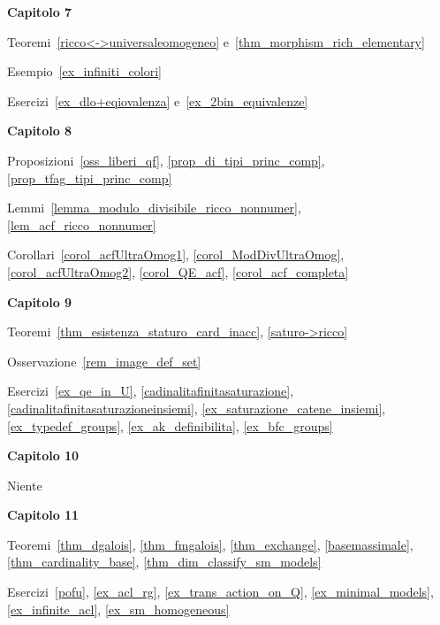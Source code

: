 \textbf{Capitolo 7}

Teoremi~\ref{ricco<->universaleomogeneo} e~\ref{thm_morphism_rich_elementary}

Esempio~\ref{ex_infiniti_colori} 

Esercizi~\ref{ex_dlo+eqiovalenza} e~\ref{ex_2bin_equivalenze}

\textbf{Capitolo 8}

Proposizioni~\ref{oss_liberi_qf}, \ref{prop_di_tipi_princ_comp}, \ref{prop_tfag_tipi_princ_comp}

Lemmi~\ref{lemma_modulo_divisibile_ricco_nonnumer}, \ref{lem_acf_ricco_nonnumer}

Corollari~\ref{corol_acfUltraOmog1}, \ref{corol_ModDivUltraOmog}, \ref{corol_acfUltraOmog2}, \ref{corol_QE_acf}, \ref{corol_acf_completa}

\textbf{Capitolo 9}

Teoremi~\ref{thm_esistenza_staturo_card_inacc}, \ref{saturo->ricco}

Osservazione~\ref{rem_image_def_set}

Esercizi~\ref{ex_qe_in_U}, \ref{cadinalitafinitasaturazione},  \ref{cadinalitafinitasaturazioneinsiemi},  \ref{ex_saturazione_catene_insiemi}, \ref{ex_typedef_groups}, \ref{ex_ak_definibilita}, \ref{ex_bfc_groups}

\textbf{Capitolo 10}

Niente

\textbf{Capitolo 11}

Teoremi~\ref{thm_dgalois}, \ref{thm_fmgalois}, \ref{thm_exchange}, \ref{basemassimale}, \ref{thm_cardinality_base}, \ref{thm_dim_classify_sm_models}

Esercizi~\ref{pofu}, \ref{ex_acl_rg}, \ref{ex_trans_action_on_Q}, \ref{ex_minimal_models}, \ref{ex_infinite_acl}, \ref{ex_sm_homogeneous}
